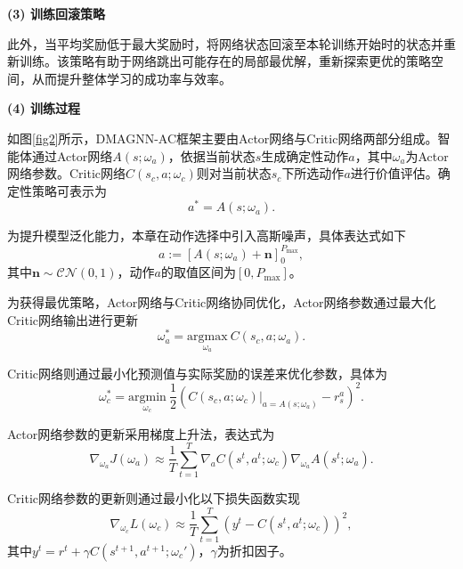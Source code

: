 \textbf{(3) 训练回滚策略}

此外，当平均奖励低于最大奖励时，将网络状态回滚至本轮训练开始时的状态并重新训练。该策略有助于网络跳出可能存在的局部最优解，重新探索更优的策略空间，从而提升整体学习的成功率与效率。

\textbf{(4) 训练过程}

如图\ref{fig2}所示，DMAGNN-AC框架主要由Actor网络与Critic网络两部分组成。智能体通过Actor网络$A(s;\omega_a)$，依据当前状态$s$生成确定性动作$a$，其中$\omega_a$为Actor网络参数。Critic网络$C(s_c,a;\omega_c)$则对当前状态$s_c$下所选动作$a$进行价值评估。确定性策略可表示为
\begin{equation}a^* = A(s;\omega_a).\end{equation}

为提升模型泛化能力，本章在动作选择中引入高斯噪声，具体表达式如下
\begin{equation}\label{eqn-34}
a := \left [ A(s;\omega_a) + \mathbf{n} \right ]^{P_{\text{max}}}_0,
\end{equation}
其中$\mathbf{n} \sim \mathcal{CN}(0,1)$，动作$a$的取值区间为$[0, P_{\text{max}}]$。

为获得最优策略，Actor网络与Critic网络协同优化，Actor网络参数通过最大化Critic网络输出进行更新
\begin{equation}\omega_a^* = \underset{\omega_a}{\text{argmax}}\ C(s_c, a; \omega_a).
\end{equation}

Critic网络则通过最小化预测值与实际奖励的误差来优化参数，具体为
\begin{equation}\omega_c^* = \underset{\omega_c}{\text{argmin}}\ \frac{1}{2}\left(C(s_c, a; \omega_c)|_{a=A(s;\omega_a)} - r_s^a\right)^2.
\end{equation}

Actor网络参数的更新采用梯度上升法，表达式为
\begin{equation}\label{eqn-37}
\nabla_{\omega_a} J(\omega_a) \approx \frac{1}{T} \sum_{t=1}^{T} \nabla_a C(s^t, a^t; \omega_c) \nabla_{\omega_a} A(s^t; \omega_a).
\end{equation}

Critic网络参数的更新则通过最小化以下损失函数实现
\begin{equation}\label{eqn-38}
\nabla_{\omega_c} L(\omega_c) \approx \frac{1}{T} \sum_{t=1}^{T} (y^t - C(s^t, a^t; \omega_c))^2,
\end{equation}
其中$y^t = r^t + \gamma C(s^{t+1}, a^{t+1}; \omega_c')$，$\gamma$为折扣因子。

